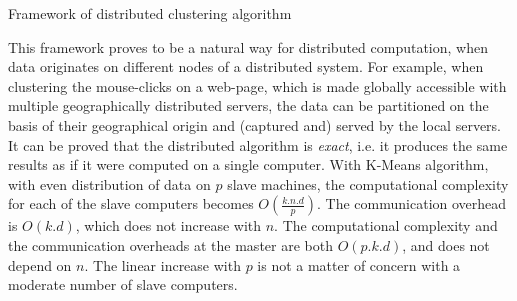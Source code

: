 \begin{algorithm}[!htbp]
	\DontPrintSemicolon
	\SetAlgoLined
	\caption{Framework of distributed clustering algorithm}
	\label{algo:bigdata:distributed-clustering}
\end{algorithm}

\noindent
This framework proves to be a natural way for distributed computation, when data originates on different nodes of a distributed
system. For example, when clustering the mouse-clicks on a web-page, which is made globally accessible with multiple geographically 
distributed servers, the data can be partitioned on the basis of their geographical origin and (captured and) served by the
local servers. It can be proved that the distributed algorithm is {\em exact}, i.e. it produces the same results as if it were 
computed on a single computer. With K-Means algorithm, with even distribution of data on $p$ slave machines, the computational complexity 
for each of the slave computers becomes $O\left(\frac{k.n.d}{p}\right)$. The communication overhead is $O(k.d)$, which does not increase 
with $n$. The computational complexity and the communication overheads at the master are both $O(p.k.d)$, and does not depend on $n$. The
linear increase with $p$ is not a matter of concern with a moderate number of slave computers.

